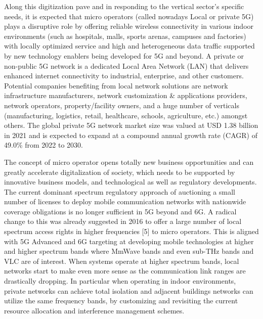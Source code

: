 \documentclass[journal,twocolumn]{IEEEtran}
\begin{document}
 Along this digitization pave and in responding to the vertical sector’s specific needs, it is expected that micro operators  (called nowadays Local or private 5G) plays a disruptive role by  offering reliable wireless connectivity in various indoor environments (such as hospitals, malls, sports arenas, campuses and factories) with locally optimized service and high and heterogeneous data traffic supported by new technology enablers being developed for 5G and beyond. A private or non-public 5G network is a dedicated Local Area Network (LAN) that delivers enhanced internet connectivity to industrial, enterprise, and other customers. 
 Potential companies benefiting from local network solutions are network infrastructure manufacturers, network customization & applications providers, network operators, property/facility owners, and a huge number of verticals (manufacturing, logistics, retail, healthcare, schools, agriculture, etc.) amongst others. The global private 5G network market size was valued at USD 1.38 billion in 2021 and is expected to expand at a compound annual growth rate (CAGR) of 49.0\% from 2022 to 2030.
 
The concept of micro operator opens totally new business opportunities and can greatly accelerate digitalization of society, which needs to be supported by innovative business models, and technological as well as regulatory developments.  
  The current dominant spectrum regulatory approach of auctioning a small number of licenses to deploy mobile communication networks with nationwide coverage obligations is no longer sufficient in 5G beyond and 6G. A radical change to this was already suggested in 2016 to offer a large number of local spectrum access rights in higher frequencies [5] to micro operators.  This is aligned with 5G Advanced and 6G targeting at developing mobile technologies at higher and higher spectrum bands where MmWave bands and even sub-THz bands and VLC are of interest. When systems operate at higher spectrum bands, local networks start to make even more sense as the communication link ranges are drastically dropping. In particular when operating in indoor environments, private networks can achieve total isolation and adjacent buildings networks can utilize the same frequency bands, by customizing and revisiting the current resource allocation and interference management schemes. 
 
\end{document}
